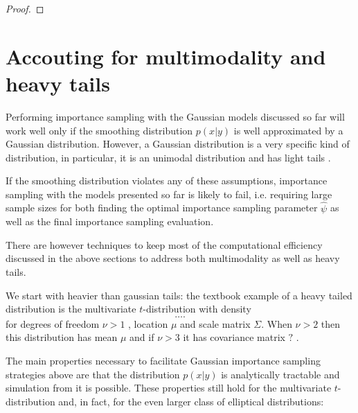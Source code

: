 \begin{theorem}
\end{theorem}

\begin{theorem}
\end{theorem}
\begin{proof}
\end{proof}


\section{Accouting for multimodality and heavy tails}
\label{sec:accouting_for_multimodality_and_heavy_tails}
Performing importance sampling with the Gaussian models discussed so far will work well only if the smoothing distribution  $p(x|y)$ is well approximated by a Gaussian distribution. However, a Gaussian distribution is a very specific kind of distribution, in particular, it is an unimodal distribution
and has light tails .

If the smoothing distribution violates any of these assumptions, importance sampling with the models presented so far is likely to fail, i.e. requiring large sample sizes for both finding the optimal importance sampling parameter $\hat \psi$ as well as the final importance sampling evaluation.

There are however techniques to keep most of the computational efficiency discussed in the above sections to address both multimodality as well as heavy tails.

We start with heavier than gaussian tails: the textbook example of a heavy tailed distribution is the multivariate $t$-distribution with density
$$
    \dots .
$$
for degrees of freedom  $\nu > 1$ , location $\mu$ and scale matrix $\Sigma$. When $\nu > 2$ then this distribution has mean $\mu$ and if $\nu > 3$ it has covariance matrix $?$ .

The main properties necessary to facilitate Gaussian importance sampling strategies above are that the distribution $p(x|y)$ is analytically tractable and simulation from it is possible. These properties still hold for the multivariate $t$-distribution and, in fact, for the even larger class of elliptical distributions:

